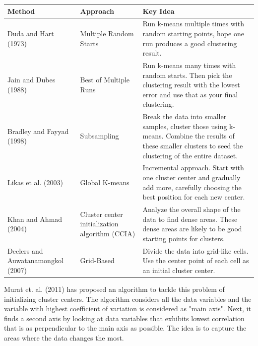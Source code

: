 \documentclass[12pt,letterpaper]{article}
\begin{document}
\begin{tabular}
	{ |p{3cm}||p{4cm}|p{7cm}| }
	\hline

	Method&Approach&Key Idea \\
	\hline
	Duda and Hart (1973) &Multiple Random Starts &Run k-means multiple times with random starting points, hope one run produces a good clustering result.  \\
	
	Jain and Dubes (1988)   &Best of Multiple Runs    &Run k-means many times with random starts. Then pick the clustering result with the lowest error and use that as your final clustering.  \\
	
	Bradley and Fayyad (1998)  &Subsampling    &Break the data into smaller samples, cluster those using k-means. Combine the results of these smaller clusters to seed the clustering of the entire dataset.  \\ 
	
	Likas et al. (2003)       &Global K-means    &Incremental approach. Start with one cluster center and gradually add more, carefully choosing the best position for each new center.  \\ 
	
	Khan and Ahmad (2004)        &Cluster center initialization algorithm (CCIA)    &Analyze the overall shape of the data to find dense areas. These dense areas are likely to be good starting points for clusters.  \\ 
	
	Deelers and Auwatanamongkol (2007)       &Grid-Based    &Divide the data into grid-like cells. Use the center point of each cell as an initial cluster center. \\
	
	\hline
	
\end{tabular} 



\vspace{.5cm}

Murat et. al. (2011) has proposed an algorithm to tackle this problem of initializing cluster centers. The algorithm considers all the data variables and the variable with highest coefficient of variation is considered as "main axis". Next, it finds a second axis by looking at data variables that exhibits lowest correlation that is as perpendicular to the main axis as possible. The idea is to capture the areas where the data changes the most.
\end{document}
